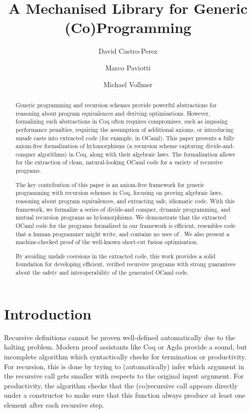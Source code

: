 \documentclass[anonymous, a4paper, UKenglish, cleveref, autoref, thm-restate]{lipics-v2021}
\title{A Mechanised Library for Generic (Co)Programming}
\author{David Castro-Perez}{School of Computing, University of Kent}{d-castro-perez@kent.ac.uk}{}{}
\author{Marco Paviotti}{School of Computing, University of Kent}{m.paviotti@kent.ac.uk}{}{}
\author{Michael Vollmer}{School of Computing, University of Kent}{m.vollmer@kent.ac.uk}{}{}
\begin{document}
\maketitle

\begin{abstract}
  Generic programming and recursion schemes provide powerful abstractions for
reasoning about program equivalences and deriving optimisations. However,
formalizing such abstractions in Coq often requires compromises, such as
imposing performance penalties, requiring the assumption of additional axioms,
or introducing unsafe casts into extracted code (for example, 
in OCaml). This paper presents a fully axiom-free formalization of hylomorphisms
(a recursion scheme capturing divide-and-conquer algorithms) in Coq, along with
their algebraic laws. The formalization allows for the extraction of clean,
natural-looking OCaml code for a variety of recursive programs.

The key contribution of this paper is an axiom-free framework for generic
programming with recursion schemes in Coq, focusing on proving algebraic laws,
reasoning about program equivalences, and extracting safe, idiomatic code. With
this framework, we formalize a series of divide-and conquer, dynamic
programming, and mutual recursion programs as hylomorphisms. We demonstrate that
the extracted OCaml code for the programs formalized in our framework is
efficient, resembles code that a human programmer might write, and contains no
uses of . We also present a machine-checked proof of the
well-known short-cut fusion optimisation.

By avoiding undafe coersions in the extracted code, this work provides a solid
foundation for developing efficient, verified recursive programs with strong
guarantees about the safety and interoperability of the generated OCaml code.
\end{abstract}

\section{Introduction}
\label{sec:intro}
Recursive definitions cannot be proven well-defined automatically due to the
halting problem. Modern proof assistants like Coq or Agda provide a sound, but
incomplete algorithm which syntactically checks for termination or
productivity.  For recursion, this is done by trying to (automatically) infer
which argument in the recursive call gets smaller with respects to the original
input argument.  For productivity, the algorithm checks that the (co)recursive
call appears directly under a constructor to make sure that this function
always produce at least one element after each recursive step.
\end{document}
